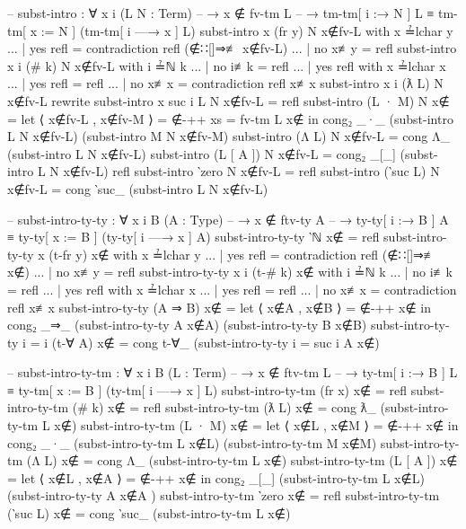 \documentclass[logo,bsc,singlespacing,parskip,online]{infthesis}
\begin{document}
\begin{code}
  -- subst-intro : ∀ {x i} (L N : Term)
  --   → x ∉ fv-tm L
  --   → tm-tm[ i :→ N ] L ≡ tm-tm[ x := N ] (tm-tm[ i —→ x ] L)
  subst-intro {x} (fr y) N x∉fv-L with x ≟lchar y
  ... | yes refl = contradiction refl (∉∷[]⇒≢ x∉fv-L)
  ... | no  x≢y  = refl
  subst-intro {x} {i} (# k) N x∉fv-L with i ≟ℕ k
  ... | no  i≢k = refl
  ... | yes refl with x ≟lchar x
  ...   | yes refl = refl
  ...   | no  x≢x  = contradiction refl x≢x
  subst-intro {x} {i} (ƛ L) N x∉fv-L
    rewrite subst-intro {x} {suc i} L N x∉fv-L = refl
  subst-intro (L · M) N x∉ =
    let ⟨ x∉fv-L , x∉fv-M ⟩ = ∉-++ {xs = fv-tm L} x∉
    in cong₂ _·_ (subst-intro L N x∉fv-L) (subst-intro M N x∉fv-M)
  subst-intro (Λ L) N x∉fv-L = cong Λ_ (subst-intro L N x∉fv-L)
  subst-intro (L [ A ]) N x∉fv-L =
    cong₂ _[_] (subst-intro L N x∉fv-L) refl
  subst-intro ‵zero N x∉fv-L = refl
  subst-intro (‵suc L) N x∉fv-L =
    cong ‵suc_ (subst-intro L N x∉fv-L)

  -- subst-intro-ty-ty : ∀ {x i B} (A : Type)
  --   → x ∉ ftv-ty A
  --   → ty-ty[ i :→ B ] A ≡ ty-ty[ x := B ] (ty-ty[ i —→ x ] A)
  subst-intro-ty-ty ‵ℕ x∉ = refl
  subst-intro-ty-ty {x} (t-fr y) x∉ with x ≟lchar y
  ... | yes refl = contradiction refl (∉∷[]⇒≢ x∉)
  ... | no  x≢y  = refl
  subst-intro-ty-ty {x} {i} (t-# k) x∉ with i ≟ℕ k
  ... | no  i≢k  = refl
  ... | yes refl with x ≟lchar x
  ...   | yes refl = refl
  ...   | no  x≢x  = contradiction refl x≢x
  subst-intro-ty-ty (A ⇒ B) x∉ = let ⟨ x∉A , x∉B ⟩ = ∉-++ x∉
    in cong₂ _⇒_ (subst-intro-ty-ty A x∉A) (subst-intro-ty-ty B x∉B)
  subst-intro-ty-ty {i = i} (t-∀ A) x∉ = cong t-∀_ (subst-intro-ty-ty {i = suc i} A x∉)

  -- subst-intro-ty-tm : ∀ {x i B} (L : Term)
  --   → x ∉ ftv-tm L
  --   → ty-tm[ i :→ B ] L ≡ ty-tm[ x := B ] (ty-tm[ i —→ x ] L)
  subst-intro-ty-tm (fr x) x∉ = refl
  subst-intro-ty-tm (# k) x∉ = refl
  subst-intro-ty-tm (ƛ L) x∉ = cong ƛ_ (subst-intro-ty-tm L x∉)
  subst-intro-ty-tm (L · M) x∉ = let ⟨ x∉L , x∉M ⟩ = ∉-++ x∉
    in cong₂ _·_ (subst-intro-ty-tm L x∉L) (subst-intro-ty-tm M x∉M)
  subst-intro-ty-tm (Λ L) x∉ = cong Λ_ (subst-intro-ty-tm L x∉)
  subst-intro-ty-tm (L [ A ]) x∉ = let ⟨ x∉L , x∉A ⟩ = ∉-++ x∉
    in cong₂ _[_] (subst-intro-ty-tm L x∉L) (subst-intro-ty-ty A x∉A )
  subst-intro-ty-tm ‵zero x∉ = refl
  subst-intro-ty-tm (‵suc L) x∉ = cong ‵suc_ (subst-intro-ty-tm L x∉)
\end{code}
\end{document}
